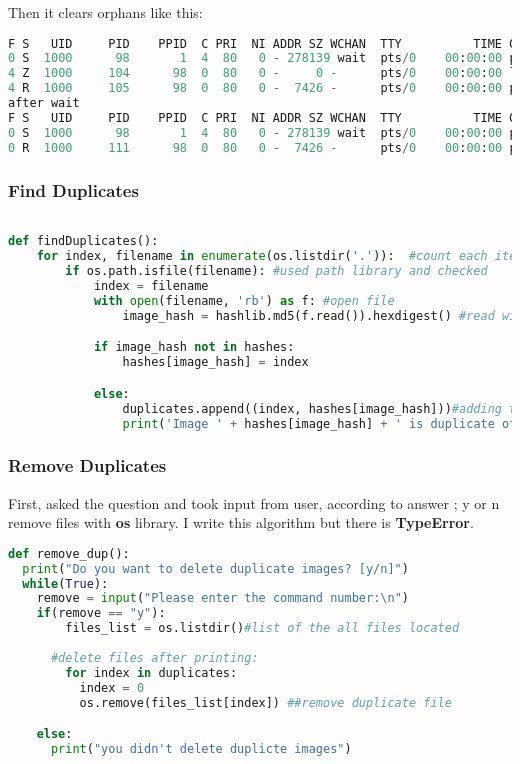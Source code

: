 \documentclass[onecolumn]{article}
\begin{document}
Then it clears orphans like this:

\begin{lstlisting}[language=Python, caption= Example Output of Clearing Orphans ]
F S   UID     PID    PPID  C PRI  NI ADDR SZ WCHAN  TTY          TIME CMD
0 S  1000      98       1  4  80   0 - 278139 wait  pts/0    00:00:00 prybar-python3
4 Z  1000     104      98  0  80   0 -     0 -      pts/0    00:00:00 ls <defunct>
4 R  1000     105      98  0  80   0 -  7426 -      pts/0    00:00:00 ps
after wait
F S   UID     PID    PPID  C PRI  NI ADDR SZ WCHAN  TTY          TIME CMD
0 S  1000      98       1  4  80   0 - 278139 wait  pts/0    00:00:00 prybar-python3
0 R  1000     111      98  0  80   0 -  7426 -      pts/0    00:00:00 ps
\end{lstlisting}



\subsubsection{Find Duplicates }


\begin{lstlisting}[language=Python, caption= Find Duplicate ]

def findDuplicates():  
    for index, filename in enumerate(os.listdir('.')):  #count each iteration
        if os.path.isfile(filename): #used path library and checked
            index = filename
            with open(filename, 'rb') as f: #open file 
                image_hash = hashlib.md5(f.read()).hexdigest() #read with haslib

            if image_hash not in hashes: 
                hashes[image_hash] = index

            else:
                duplicates.append((index, hashes[image_hash]))#adding the duplicate list 
                print('Image ' + hashes[image_hash] + ' is duplicate of Image ' + index)

\end{lstlisting}

\subsubsection{Remove Duplicates  }

First, asked the question and took input from user, according to answer ; y or n remove files with \textbf{os}  library. I write this algorithm but there is \textbf{TypeError}. 

\begin{lstlisting}[language=Python, caption= Remove Duplicates ]
def remove_dup():
  print("Do you want to delete duplicate images? [y/n]")             
  while(True):
    remove = input("Please enter the command number:\n")  
    if(remove == "y"): 
        files_list = os.listdir()#list of the all files located
        
      #delete files after printing:
        for index in duplicates:
          index = 0
          os.remove(files_list[index]) ##remove duplicate file

    else:
      print("you didn't delete duplicte images")
\end{lstlisting}
\end{document}
